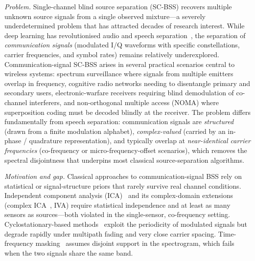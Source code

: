 \documentclass[twocolumn,english]{svjour3}
\begin{document}
\begin{sloppypar}
\emph{Problem.} Single-channel blind source separation (SC-BSS) recovers multiple unknown source signals from a single observed mixture---a severely underdetermined problem that has attracted decades of research interest. While deep learning has revolutionised audio and speech separation~\cite{luo2019conv,subakan2021sepformer,wang2023tfgridnet}, the separation of \emph{communication signals} (modulated I/Q waveforms with specific constellations, carrier frequencies, and symbol rates) remains relatively underexplored. Communication-signal SC-BSS arises in several practical scenarios central to wireless systems: spectrum surveillance where signals from multiple emitters overlap in frequency, cognitive radio networks needing to disentangle primary and secondary users, electronic-warfare receivers requiring blind demodulation of co-channel interferers, and non-orthogonal multiple access (NOMA) where superposition coding must be decoded blindly at the receiver. The problem differs fundamentally from speech separation: communication signals are \emph{structured} (drawn from a finite modulation alphabet), \emph{complex-valued} (carried by an in-phase / quadrature representation), and typically overlap at \emph{near-identical carrier frequencies} (co-frequency or micro-frequency-offset scenarios), which removes the spectral disjointness that underpins most classical source-separation algorithms.
\end{sloppypar}

\begin{sloppypar}
\emph{Motivation and gap.} Classical approaches to communication-signal BSS rely on statistical or signal-structure priors that rarely survive real channel conditions. Independent component analysis (ICA)~\cite{hyvarinen2000ica} and its complex-domain extensions (complex ICA~\cite{le2011ica}, IVA) require statistical independence and at least as many sensors as sources---both violated in the single-sensor, co-frequency setting. Cyclostationary-based methods~\cite{gardner1991exploitation,gardner1991cpm} exploit the periodicity of modulated signals but degrade rapidly under multipath fading and very close carrier spacing. Time-frequency masking~\cite{yellin1996,sawada2019} assumes disjoint support in the spectrogram, which fails when the two signals share the same band.
\end{sloppypar}
\end{document}
